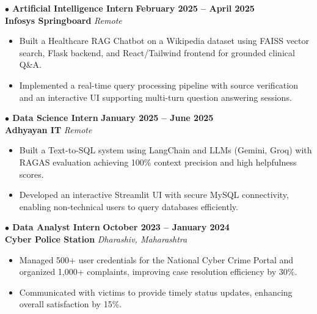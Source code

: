 \documentclass[a4paper,10pt]{article}
\begin{document}
\vspace{5pt}

\noindent
\textbf{\normalsize $\bullet$ Artificial Intelligence Intern} \hfill \textbf{February 2025 -- April 2025} \\
\textbf{Infosys Springboard} \hfill \textit{Remote}
\begin{itemize}
    \item Built a Healthcare RAG Chatbot on a Wikipedia dataset using FAISS vector search, Flask backend, and React/Tailwind frontend for grounded clinical Q\&A.
    \item Implemented a real-time query processing pipeline with source verification and an interactive UI supporting multi-turn question answering sessions.
\end{itemize}

\vspace{3pt}

\noindent
\textbf{\normalsize $\bullet$ Data Science Intern} \hfill \textbf{January 2025 -- June 2025} \\
\textbf{Adhyayan IT} \hfill \textit{Remote}
\begin{itemize}
    \item Built a Text-to-SQL system using LangChain and LLMs (Gemini, Groq) with RAGAS evaluation achieving 100\% context precision and high helpfulness scores.
    \item Developed an interactive Streamlit UI with secure MySQL connectivity, enabling non-technical users to query databases efficiently.
\end{itemize}

\vspace{3pt}

\noindent
\textbf{\normalsize $\bullet$ Data Analyst Intern} \hfill \textbf{October 2023 -- January 2024} \\
\textbf{Cyber Police Station} \hfill \textit{Dharashiv, Maharashtra}
\begin{itemize}
    \item Managed 500+ user credentials for the National Cyber Crime Portal and organized 1,000+ complaints, improving case resolution efficiency by 30\%.
    \item Communicated with victims to provide timely status updates, enhancing overall satisfaction by 15\%.
\end{itemize}

\end{document}
